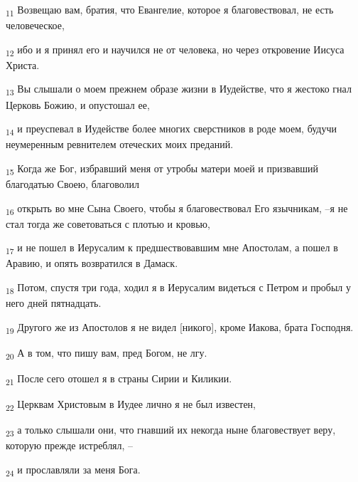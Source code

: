 \begin{tcolorbox}
\textsubscript{11} Возвещаю вам, братия, что Евангелие, которое я благовествовал, не есть человеческое,
\end{tcolorbox}
\begin{tcolorbox}
\textsubscript{12} ибо и я принял его и научился не от человека, но через откровение Иисуса Христа.
\end{tcolorbox}
\begin{tcolorbox}
\textsubscript{13} Вы слышали о моем прежнем образе жизни в Иудействе, что я жестоко гнал Церковь Божию, и опустошал ее,
\end{tcolorbox}
\begin{tcolorbox}
\textsubscript{14} и преуспевал в Иудействе более многих сверстников в роде моем, будучи неумеренным ревнителем отеческих моих преданий.
\end{tcolorbox}
\begin{tcolorbox}
\textsubscript{15} Когда же Бог, избравший меня от утробы матери моей и призвавший благодатью Своею, благоволил
\end{tcolorbox}
\begin{tcolorbox}
\textsubscript{16} открыть во мне Сына Своего, чтобы я благовествовал Его язычникам, --я не стал тогда же советоваться с плотью и кровью,
\end{tcolorbox}
\begin{tcolorbox}
\textsubscript{17} и не пошел в Иерусалим к предшествовавшим мне Апостолам, а пошел в Аравию, и опять возвратился в Дамаск.
\end{tcolorbox}
\begin{tcolorbox}
\textsubscript{18} Потом, спустя три года, ходил я в Иерусалим видеться с Петром и пробыл у него дней пятнадцать.
\end{tcolorbox}
\begin{tcolorbox}
\textsubscript{19} Другого же из Апостолов я не видел [никого], кроме Иакова, брата Господня.
\end{tcolorbox}
\begin{tcolorbox}
\textsubscript{20} А в том, что пишу вам, пред Богом, не лгу.
\end{tcolorbox}
\begin{tcolorbox}
\textsubscript{21} После сего отошел я в страны Сирии и Киликии.
\end{tcolorbox}
\begin{tcolorbox}
\textsubscript{22} Церквам Христовым в Иудее лично я не был известен,
\end{tcolorbox}
\begin{tcolorbox}
\textsubscript{23} а только слышали они, что гнавший их некогда ныне благовествует веру, которую прежде истреблял, --
\end{tcolorbox}
\begin{tcolorbox}
\textsubscript{24} и прославляли за меня Бога.
\end{tcolorbox}
